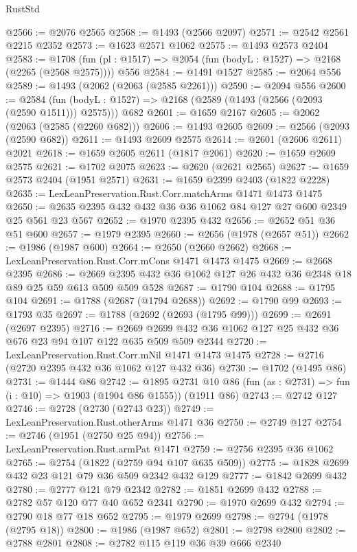 \begin{lexlean}{RustStd}
\begin{coremodule}
@2566 := @2076 @2565
@2568 := @1493 (@2566 @2097)
@2571 := @2542 @2561 @2215 @2352
@2573 := @1623 @2571 @1062
@2575 := @1493 @2573 @2404
@2583 := @1708 (fun (pl : @1517) => @2054 (fun (bodyL : @1527) => @2168 (@2265 (@2568 @2575)))) @556
@2584 := @1491 @1527
@2585 := @2064 @556
@2589 := @1493 (@2062 (@2063 (@2585 @2261)))
@2590 := @2094 @556
@2600 := @2584
    (fun (bodyL : @1527) => @2168 (@2589 (@1493 (@2566 (@2093 (@2590 @1511))) @2575)))
    @682
@2601 := @1659 @2167
@2605 := @2062 (@2063 (@2585 (@2260 @682)))
@2606 := @1493 @2605
@2609 := @2566 (@2093 (@2590 @682))
@2611 := @1493 @2609 @2575
@2614 := @2601 (@2606 @2611) @2021
@2618 := @1659 @2605 @2611 (@1817 @2061)
@2620 := @1659 @2609 @2575
@2621 := @1702 @2075
@2623 := @2620 (@2621 @2565)
@2627 := @1659 @2573 @2404 (@1951 @2571)
@2631 := @1659 @2399 @2403 (@1822 @2228)
@2635 := LexLeanPreservation.Rust.Corr.matchArms @1471 @1473 @1475
@2650 := @2635 @2395 @432 @432 @36 @36 @1062 @84 @127 @27 @600 @2349 @25 @561 @23 @567
@2652 := @1970 @2395 @432
@2656 := @2652 @51 @36 @51 @600
@2657 := @1979 @2395
@2660 := @2656 (@1978 (@2657 @51))
@2662 := @1986 (@1987 @600)
@2664 := @2650 (@2660 @2662)
@2668 := LexLeanPreservation.Rust.Corr.mCons @1471 @1473 @1475
@2669 := @2668 @2395
@2686 := @2669 @2395 @432 @36 @1062 @127 @26 @432 @36 @2348 @18 @89 @25 @59 @613 @509 @509 @528
@2687 := @1790 @104
@2688 := @1795 @104
@2691 := @1788 (@2687 (@1794 @2688))
@2692 := @1790 @99
@2693 := @1793 @35
@2697 := @1788 (@2692 (@2693 (@1795 @99)))
@2699 := @2691 (@2697 @2395)
@2716 := @2669 @2699 @432 @36 @1062 @127 @25 @432 @36 @676 @23 @94 @107 @122 @635 @509 @509 @2344
@2720 := LexLeanPreservation.Rust.Corr.mNil @1471 @1473 @1475
@2728 := @2716 (@2720 @2395 @432 @36 @1062 @127 @432 @36)
@2730 := @1702 (@1495 @86)
@2731 := @1444 @86
@2742 := @1895
    @2731
    @10
    @86
    (fun (as : @2731) => fun (i : @10) => @1903 (@1904 @86 @1555))
    (@1911 @86)
@2743 := @2742 @127
@2746 := @2728 (@2730 (@2743 @23))
@2749 := LexLeanPreservation.Rust.otherArms @1471 @36
@2750 := @2749 @127
@2754 := @2746 (@1951 (@2750 @25 @94))
@2756 := LexLeanPreservation.Rust.armPat @1471
@2759 := @2756 @2395 @36 @1062
@2765 := @2754 (@1822 (@2759 @94 @107 @635 @509))
@2775 := @1828 @2699 @432 @23 @121 @79 @36 @509 @2342 @432 @129
@2777 := @1842 @2699 @432
@2780 := @2777 @121 @79 @2342
@2782 := @1851 @2699 @432
@2788 := @2782 @57 @120 @77 @40 @652 @2341
@2790 := @1970 @2699 @432
@2794 := @2790 @18 @77 @18 @652
@2795 := @1979 @2699
@2798 := @2794 (@1978 (@2795 @18))
@2800 := @1986 (@1987 @652)
@2801 := @2798 @2800
@2802 := @2788 @2801
@2808 := @2782 @115 @119 @36 @39 @666 @2340

\end{coremodule}
\end{lexlean}
